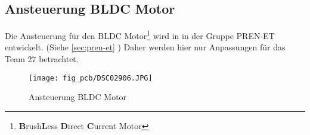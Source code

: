 \subsection{Ansteuerung BLDC Motor}
\label{sec:bldc}
Die Ansteuerung für den BLDC Motor\footnote{\textbf{B}rush\textbf{L}ess 
\textbf{D}irect \textbf{C}urrent Motor} wird in in der Gruppe PREN-ET 
entwickelt. (Siehe \ref{sec:pren-et} ) 
Daher werden hier nur Anpassungen für das Team 27 betrachtet. 
\begin{figure}[h!]
    \centering
    \texttt{[image: fig\_pcb/DSC02906.JPG]}
    \caption{Ansteuerung BLDC Motor}
    \label{fig:dc}
\end{figure}
